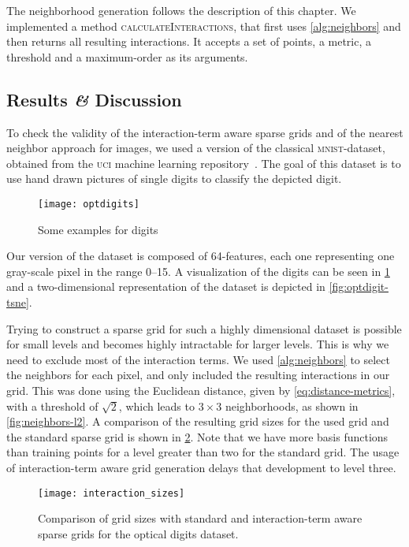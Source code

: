 The neighborhood generation follows the description of this chapter.
We implemented a method \textsc{calculateInteractions}, that first uses
\cref{alg:neighbors} and then returns all resulting interactions.
It accepts a set of points, a metric, a threshold and a maximum-order as its arguments.

\subsection{Results \textit{\&} Discussion}
To check the validity of the interaction-term aware sparse grids and of the
nearest neighbor approach for images, we used a version of the classical \textsc{mnist}-dataset, obtained from the
\textsc{uci} machine learning repository~\cite{datasets-uci}.
The goal of this dataset is to use hand drawn pictures of single digits to classify the depicted digit.
\begin{figure}[htb]
  \centering
  \texttt{[image: optdigits]}
  \caption{Some examples for digits}
  \label{fig:optdigit-images}
\end{figure}
Our version of the dataset is composed of 64-features, each one representing one gray-scale pixel in the range 0--15.
A visualization of the digits can be seen in \cref{fig:optdigit-images} and a
two-dimensional representation of the dataset is depicted in \vref{fig:optdigit-tsne}.

Trying to construct a sparse grid for such a highly dimensional dataset is
possible for small levels and becomes highly intractable for larger levels.
This is why we need to exclude most of the interaction terms.
We used \cref{alg:neighbors} to select the neighbors for each pixel, and only included
the resulting interactions in our grid.
This was done using the Euclidean distance, given by \cref{eq:distance-metrics}, with a threshold of \(\sqrt{2}\),
which leads to \(3 \times 3\) neighborhoods, as shown in \cref{fig:neighbors-l2}.
A comparison of the resulting grid sizes for the used grid and the standard
sparse grid is shown in \cref{fig:optdigit-gridsize}.
Note that we have more basis functions than training points for a level greater
than two for the standard grid.
The usage of interaction-term aware grid generation delays that development to
level three.

\begin{figure}[htb]
  \centering
  \texttt{[image: interaction\_sizes]}
  \caption{Comparison of grid sizes with standard and interaction-term aware
    sparse grids for the optical digits dataset.}
  \label{fig:optdigit-gridsize}
\end{figure}

